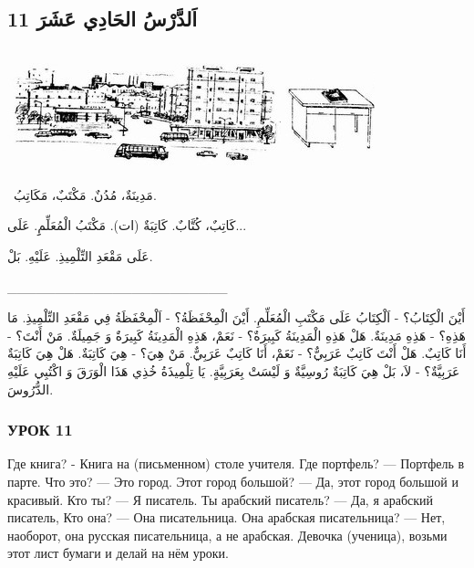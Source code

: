 \documentclass[a5paper]{article}
\begin{document}
\subsection{11 اَلدَّرْسُ الحَادِي عَشَرَ}
 \includegraphics[width=3.1252in,height=1.3752in]{images/MuhammadBagauddinprettified-img017.jpg}   \includegraphics[width=1.0209in,height=1.3646in]{images/MuhammadBagauddinprettified-img018.jpg} 

\ مَدِينَةٌ، مُدُنٌ. مَكْتَبٌ، مَكَاتِبُ.

كَاتِبٌ، كُتَّابٌ. كَاتِبَةٌ (ات). مَكْتَبُ الْمُعَلِّمِِ. عَلَى...

عَلَى مَقْعَدِ التِّلْمِيذِ. عَلَيْهِ. بَلْ.

\_\_\_\_\_\_\_\_\_\_\_\_\_\_\_\_\_\_\_\_\_\_\_ 

أَيْنَ الْكِتَابُ؟ - اَلْكِتَابُ عَلَى مَكْتَبِ الْمُعَلِّمِ. أَيْنَ الْمِحْفَظَةُ؟ - اَلْمِحْفَظَةُ فِي مَقْعَدِ التِّلْمِيذِ. مَا هَذِهِ؟ - هَذِهِ مَدِينَةٌ. هَلْ هَذِهِ الْمَدِينَةُ كَبِيرَةٌ؟ - نَعَمْ، هَذِهِ الْمَدِينَةُ كَبِيرَةٌ وَ جَمِيلَةٌ. مَنْ أَنْتَ؟ - أَنَا كَاتِبٌ. هَلْ أَنْتَ كَاتِبٌ عَرَبِيٌّ؟ - نَعَمْ، أَنَا كَاتِبٌ عَرَبِيٌّ. مَنْ هِيَ؟ - هِيَ كَاتِبَةٌ. هَلْ هِيَ كَاتِبَةٌ عَرَبِيَّةٌ؟ - لاَ، بَلْ هِيَ كَاتِبَةٌ رُوسِيَّةٌ وَ لَيْسَتْ بِعَرَبِيَّةٍ. يَا تِلْمِيذَةُ خُذِي هَذَا الْوَرَقَ وَ اكْتُبِي عَلَيْهِ الدُّرُوسَ.

\subsubsection{УРОК 11}
Где книга? - Книга на (письменном) столе учителя. Где порт­фель? — Портфель в парте. Что это? — Это город. Этот город большой? — Да, этот город большой и красивый. Кто ты? — Я писатель. Ты арабский писатель? — Да, я арабский писатель, Кто она? — Она писательница. Она арабская писательница? — Нет, наоборот, она русская писательница, а не арабская. Девочка (ученица), возьми этот лист бумаги и делай на нём уроки.
\end{document}

